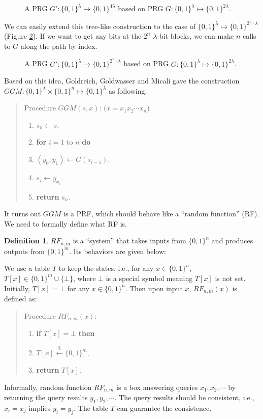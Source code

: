 \documentclass[12pt]{article}
\newcommand{\bits}{\{0,1\}}
\newcommand{\getsr}{\stackrel{\$}{\gets}}
\newcommand{\tab}{\hspace{0.3in}}
\theoremstyle{definition}
\newtheorem{definition}[theorem]{Definition}
\begin{document}
\begin{figure}[!t]
\caption{A PRG $G' : \bits^\lambda \mapsto \bits^{4\lambda}$ based on PRG $G : \bits^\lambda \mapsto \bits^{2\lambda}$.}
\label{fig:2tree}
\end{figure}

We can easily extend this tree-like construction to the case of $\bits^\lambda \mapsto \bits^{2^n\cdot\lambda}$ (Figure \ref{fig:ntree}).
If we want to get any bits at the $2^n$ $\lambda$-bit blocks, we can make $n$ calls to $G$ along the path by index.

\begin{figure}[!t]
\caption{A PRG $G' : \bits^\lambda \mapsto \bits^{2^n\cdot\lambda}$ based on PRG $G : \bits^\lambda \mapsto \bits^{2\lambda}$.}
\label{fig:ntree}
\end{figure}

Based on this idea, Goldreich, Goldwasser and Micali \cite{GGM86} gave the construction $GGM : \bits^\lambda \times \bits^n \mapsto \bits^\lambda$ as following:
\begin{quote}
Procedure $GGM(s,x)$: ($x=x_1x_2\cdots x_n$)
\begin{enumerate}
\item $s_0 \gets s$.
\item {\bf for} $i=1$ to $n$ {\bf do}
\item \tab $(y_0, y_1) \gets G(s_{i-1})$.
\item \tab $s_i \gets y_{x_i}$.
\item {\bf return} $s_n$.
\end{enumerate}
\end{quote}
It turns out $GGM$ is a PRF, which should behave like a ``random function'' (RF). We need to formally define what RF is.
\begin{definition}
$RF_{n,m}$ is a ``system'' that takes inputs from $\bits^n$ and produces outputs from $\bits^m$. Its behaviors are given below:

We use a table $T$ to keep the states, i.e., for any $x\in\bits^n$, $T[x] \in \bits^m \cup \{\bot\}$, where $\bot$ is a special symbol meaning $T[x]$ is not set. Initially, $T[x] = \bot$ for any $x\in\bits^n$. Then upon input $x$, $RF_{n,m}(x)$ is defined as:
\begin{quote}
Procedure $RF_{n,m}(x)$:
\begin{enumerate}
\item {\bf if} $T[x] = \bot$ {\bf then}
\item \tab $T[x] \getsr \bits^m$.
\item {\bf return} $T[x]$.
\end{enumerate}
\end{quote}
\end{definition}
Informally, random function $RF_{n,m}$ is a box answering queries $x_1,x_2,\cdots$ by returning the query results $y_1,y_2,\cdots$. The query results should be consistent, i.e., $x_i = x_j$ implies $y_i = y_j$. The table $T$ can guarantee the consistence.
\end{document}
